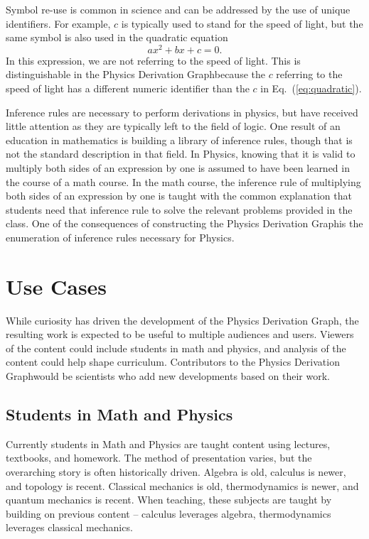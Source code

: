 \documentclass{article}
\newcommand{\eqn}[1]{Eq.\ (\ref{#1})}
\newcommand{\pdg}{Physics Derivation Graph}
\begin{document}
\begin{multicols}{2}
Symbol re-use is common in science and can be addressed by the use of unique identifiers. For example, $c$ is typically used to stand for the speed of light, but the same symbol is also used in the quadratic equation
\begin{equation}
a x^2+b x+c =0.
\label{eq:quadratic}
\end{equation}
In this expression, we are not referring to the speed of light. This is distinguishable in the \pdg because the $c$ referring to the speed of light has a different numeric identifier than the $c$ in \eqn{eq:quadratic}. 

Inference rules are necessary to perform derivations in physics, but have received little attention as they are typically left to the field of logic. One result of an education in mathematics is building a library of inference rules, though that is not the standard description in that field. In Physics, knowing that it is valid to multiply both sides of an expression by one is assumed to have been learned in the course of a math course. In the math course, the inference rule of multiplying both sides of an expression by one is taught with the common explanation that students need that inference rule to solve the relevant problems provided in the class. 
One of the consequences of constructing the \pdg is the enumeration of inference rules necessary for Physics. 

\section{Use Cases\label{sec:use_cases}}

While curiosity has driven the development of the \pdg, the resulting work is expected to be useful to multiple audiences and users. Viewers of the content could include students in math and physics, and analysis of the content could help shape curriculum. Contributors to the \pdg would be scientists who add new developments based on their work.

\subsection{Students in Math and Physics}

Currently students in Math and Physics are taught content using lectures, textbooks, and homework. The method of presentation varies, but the overarching story is often historically driven. Algebra is old, calculus is newer, and topology is recent. Classical mechanics is old, thermodynamics is newer, and quantum mechanics is recent. When teaching, these subjects are taught by building on previous content -- calculus leverages algebra, thermodynamics leverages classical mechanics. 


\end{multicols}
\end{document}
